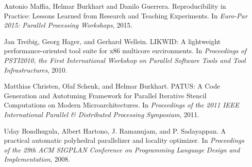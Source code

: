 \documentclass[portrait,a0paper,fontscale=0.292]{baposter}
\begin{document}
\begin{poster}
{\begin{thebibliography}{1}
			Antonio Maffia, Helmar Burkhart and Danilo Guerrera.
			\newblock Reproducibility in Practice: Lessons Learned from Research 
			and Teaching Experiments.
			\newblock In {\em Euro-Par 2015: Parallel Processing Workshops}, 2015.
			
			Jan Treibig, Georg Hager, and Gerhard Wellein.
			\newblock LIKWID: A lightweight performance-oriented tool suite for 
			x86 multicore environments.
			\newblock In {\em Proceedings of PSTI2010, the First International 
			Workshop on Parallel Software Tools and Tool Infrastructures}, 2010.
			
			Matthias Christen, Olaf Schenk, and Helmar Burkhart.
			\newblock PATUS: A Code Generation and Autotuning Framework for Parallel 
			Iterative Stencil Computations on Modern Microarchitectures.
			\newblock In {\em Proceedings of the 2011 IEEE International Parallel 
			\& Distributed Processing Symposium}, 2011.
			
			Uday Bondhugula, Albert Hartono, J. Ramanujam, and P. Sadayappan.
			\newblock A practical automatic polyhedral parallelizer and locality 
			optimizer.
			\newblock In {\em Proceedings of the 29th ACM SIGPLAN Conference on 
			Programming Language Design and Implementation}, 2008.
			
		\end{thebibliography}
	}

\end{poster}%
%
\end{document}
